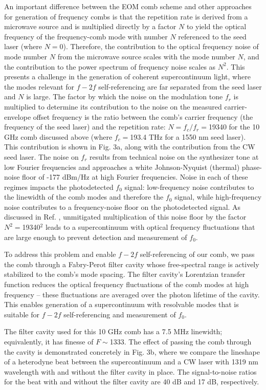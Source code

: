 An important difference between the EOM comb scheme and other approaches for generation of frequency combs is that the repetition rate is derived from a microwave source and is multiplied directly by a factor $N$ to yield the optical frequency of the frequency-comb mode with number $N$ referenced to the seed laser (where $N=0$). Therefore, the contribution to the optical frequency noise of mode number $N$ from the microwave source scales with the mode number $N$, and the contribution to the power spectrum of frequency noise scales as $N^2$. This presents a challenge in the generation of coherent supercontinuum light, where the modes relevant for $f-2f$ self-referencing are far separated from the seed laser and $N$ is large. The factor by which the noise on the modulation tone $f_r$ is multiplied to determine its contribution to the noise on the measured carrier-envelope offset frequency is the ratio between the comb’s carrier frequency (the frequency of the seed laser) and the repetition rate: $N=f_c/f_r=$19340 for the 10 GHz comb discussed above (where $f_c=$193.4 THz for a 1550 nm seed laser). This contribution is shown in Fig. 3a, along with the contribution from the CW seed laser. The noise on $f_r$ results from technical noise on the synthesizer tone at low Fourier frequencies and approaches a white Johnson-Nyquist (thermal) phase-noise floor of -177 dBm/Hz at high Fourier frequencies. Noise in each of these regimes impacts the photodetected $f_0$ signal: low-frequency noise contributes to the linewidth of the comb modes and therefore the $f_0$ signal, while high-frequency noise contributes to a frequency-noise floor on the photodetected signal\cite{Domenico2010}. As discussed in Ref. \cite{Beha2017}, unmitigated multiplication of this noise floor by the factor $N^2=$19340$^2$ leads to a supercontinuum with optical frequency fluctuations that are large enough to prevent detection and measurement of $f_0$. 

To address this problem and enable $f-2f$ self-referencing of our comb, we pass the comb through a Fabry-Perot filter cavity whose free-spectral range is actively stabilized to the comb’s mode spacing. The filter cavity’s Lorentzian transfer function reduces the optical frequency fluctuations of the comb modes at high frequency – these fluctuations are averaged over the photon lifetime of the cavity. This enables generation of a supercontinuum with resolvable modes that is suitable for $f-2f$ self-referencing and measurement of $f_0$. 

The filter cavity used for this 10 GHz comb has a 7.5 MHz linewidth; equivalently, it has finesse of $F\sim$1333. The effect of passing the comb through the cavity is demonstrated concretely in Fig. 3b, where we compare the lineshape of a heterodyne beat between the supercontinuum and a CW laser with 1319 nm wavelength with and without the filter cavity in place. The signal-to-noise ratios for the beat with and without the filter cavity are 40 dB and 17 dB, respectively.


